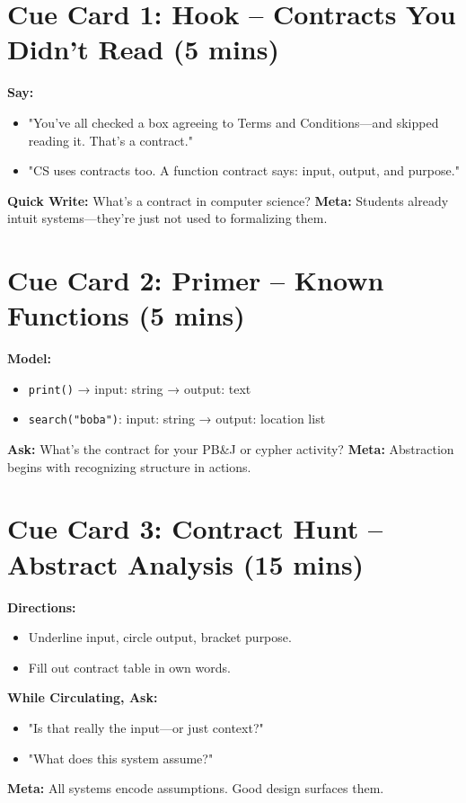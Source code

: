 \documentclass[10pt]{article}
\begin{document}
\section*{Cue Card 1: Hook – Contracts You Didn't Read (5 mins)}
\textbf{Say:}
\begin{itemize}
  \item "You’ve all checked a box agreeing to Terms and Conditions—and skipped reading it. That’s a contract."
  \item "CS uses contracts too. A function contract says: input, output, and purpose."
\end{itemize}
\textbf{Quick Write:} What’s a contract in computer science?
\textbf{Meta:} Students already intuit systems—they’re just not used to formalizing them.

\section*{Cue Card 2: Primer – Known Functions (5 mins)}
\textbf{Model:}
\begin{itemize}
  \item \texttt{print()} → input: string → output: text
  \item \texttt{search("boba")}: input: string → output: location list
\end{itemize}
\textbf{Ask:} What's the contract for your PB\&J or cypher activity?
\textbf{Meta:} Abstraction begins with recognizing structure in actions.

\section*{Cue Card 3: Contract Hunt – Abstract Analysis (15 mins)}
\textbf{Directions:}
\begin{itemize}
  \item Underline input, circle output, bracket purpose.
  \item Fill out contract table in own words.
\end{itemize}
\textbf{While Circulating, Ask:}
\begin{itemize}
  \item "Is that really the input—or just context?"
  \item "What does this system assume?"
\end{itemize}
\textbf{Meta:} All systems encode assumptions. Good design surfaces them.
\end{document}
